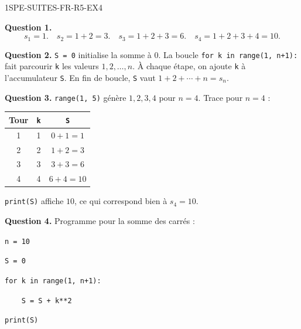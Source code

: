 \begin{corrige}{1SPE-SUITES-FR-R5-EX4}

\textbf{Question 1.}
\[
s_1 = 1. \quad s_2 = 1+2 = 3. \quad s_3 = 1+2+3 = 6. \quad s_4 = 1+2+3+4 = 10.
\]


\textbf{Question 2.} \verb|S = 0| initialise la somme à $0$. La boucle \verb|for k in range(1, n+1):| fait parcourir \verb|k| les valeurs $1, 2, \ldots, n$. À chaque étape, on ajoute \verb|k| à l'accumulateur \verb|S|. En fin de boucle, \verb|S| vaut $1 + 2 + \cdots + n = s_n$.

\textbf{Question 3.} \verb|range(1, 5)| génère $1, 2, 3, 4$ pour $n = 4$. Trace pour $n = 4$ :

\begin{center}
\begin{tabular}{|c|c|c|}
\hline
Tour & \verb|k| & \verb|S| \\
\hline
1 & 1 & $0+1=1$ \\
2 & 2 & $1+2=3$ \\
3 & 3 & $3+3=6$ \\
4 & 4 & $6+4=10$ \\
\hline
\end{tabular}
\end{center}

\verb|print(S)| affiche $10$, ce qui correspond bien à $s_4 = 10$. \checkmark


\textbf{Question 4.} Programme pour la somme des carrés :

\medskip
\verb|n = 10|

\verb|S = 0|

\verb|for k in range(1, n+1):|

\verb|    S = S + k**2|

\verb|print(S)|

\end{corrige}
